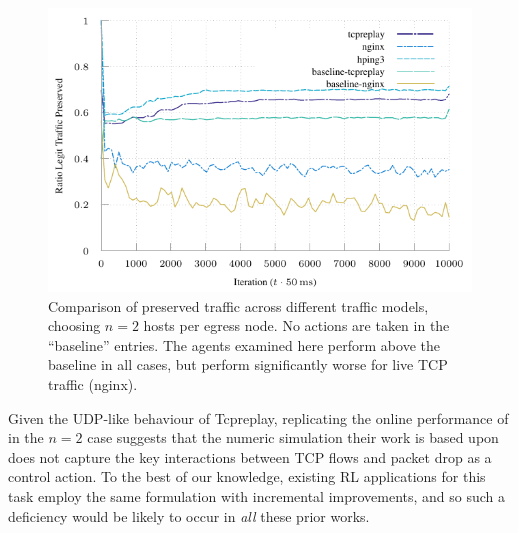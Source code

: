 \documentclass[conference, letterpaper, 10pt, times]{IEEEtran}
\begin{document}

\begin{figure}
	\centering
	\includegraphics[width=0.95\linewidth]{../plots/online-varyN-nginx}
	\caption{
		Comparison of preserved traffic across different traffic models, choosing $n=2$ hosts per egress node.
		No actions are taken in the ``baseline'' entries.
		The agents examined here perform above the baseline in all cases, but perform significantly worse for live TCP traffic (nginx).
		\label{fig:nginx-coffin-nail}
	}
\end{figure}

Given the UDP-like behaviour of Tcpreplay, replicating the online performance of \citeauthor{DBLP:journals/eaai/MalialisK15} in the $n=2$ case suggests that the numeric simulation their work is based upon does not capture the key interactions between TCP flows and packet drop as a control action.
To the best of our knowledge, existing RL applications for this task employ the same formulation with incremental improvements, and so such a deficiency would be likely to occur in \emph{all} these prior works.
\end{document}
